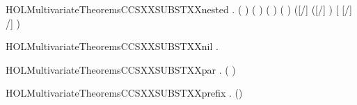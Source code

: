 \newcommand{\HOLMultivariateTheoremsCCSXXSUBSTXXISXXPROC}{\UseVerbatim{HOLMultivariateTheoremsCCSXXSUBSTXXISXXPROC}}
\begin{SaveVerbatim}{HOLMultivariateTheoremsCCSXXSUBSTXXnested}
\HOLTokenTurnstile{} \HOLSymConst{\HOLTokenForall{}}   .
         \HOLSymConst{\HOLTokenConj{}} (  \HOLSymConst{=}  ) \HOLSymConst{\HOLTokenConj{}}
       (  \HOLSymConst{=}  ) \HOLSymConst{\HOLTokenConj{}}  ( ) ( ) \HOLSymConst{\HOLTokenImp{}}
       ([/] ([/] ) \HOLSymConst{=} [ [/] /] )
\end{SaveVerbatim}
\newcommand{\HOLMultivariateTheoremsCCSXXSUBSTXXnested}{\UseVerbatim{HOLMultivariateTheoremsCCSXXSUBSTXXnested}}
\begin{SaveVerbatim}{HOLMultivariateTheoremsCCSXXSUBSTXXnil}
\HOLTokenTurnstile{} \HOLSymConst{\HOLTokenForall{}}.    \HOLSymConst{=} 
\end{SaveVerbatim}
\newcommand{\HOLMultivariateTheoremsCCSXXSUBSTXXnil}{\UseVerbatim{HOLMultivariateTheoremsCCSXXSUBSTXXnil}}
\begin{SaveVerbatim}{HOLMultivariateTheoremsCCSXXSUBSTXXpar}
\HOLTokenTurnstile{} \HOLSymConst{\HOLTokenForall{}}  .
         ( \HOLSymConst{\ensuremath{\parallel}} ) \HOLSymConst{=}
          \HOLSymConst{\ensuremath{\parallel}}   
\end{SaveVerbatim}
\newcommand{\HOLMultivariateTheoremsCCSXXSUBSTXXpar}{\UseVerbatim{HOLMultivariateTheoremsCCSXXSUBSTXXpar}}
\begin{SaveVerbatim}{HOLMultivariateTheoremsCCSXXSUBSTXXprefix}
\HOLTokenTurnstile{} \HOLSymConst{\HOLTokenForall{}}  .   () \HOLSymConst{=}   
\end{SaveVerbatim}
